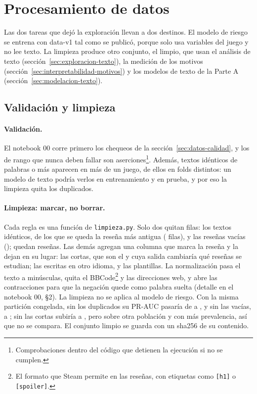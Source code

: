 \section{Procesamiento de datos}\label{sec:procesamiento}

Las dos tareas que dejó la exploración llevan a dos destinos. El modelo de riesgo se entrena con
data-v1 tal como se publicó, porque solo usa variables del juego y no lee texto. La limpieza
produce otro conjunto, el limpio, que usan el análisis de texto (sección~\ref{sec:exploracion-texto}),
la medición de los motivos (sección~\ref{sec:interpretabilidad-motivos}) y los modelos de texto de
la Parte A (sección~\ref{sec:modelacion-texto}).

\subsection{Validación y limpieza}\label{sec:procesamiento-validacion}\label{sec:procesamiento-limpieza}

\paragraph{Validación.} El notebook 00 corre primero los chequeos de la
sección~\ref{sec:datos-calidad}, y los de rango que nunca deben fallar son
aserciones\footnote{Comprobaciones dentro del código que detienen la ejecución si no se cumplen.}.
Además, \cifraTextosEntreJuegos{} textos idénticos de \cifraPalabrasDeUnaCopia{} palabras o más
aparecen en más de un juego, \cifraCopiasEnFoldsDistintos{} de ellos en folds distintos: un modelo
de texto podría verlos en entrenamiento y en prueba, y por eso la limpieza quita los duplicados.

\paragraph{Limpieza: marcar, no borrar.} Cada regla es una función de \texttt{limpieza.py}. Solo
dos quitan filas: los textos idénticos, de los que se
queda la reseña más antigua (\cifraDuplicadosQuitados{} filas), y las reseñas vacías
(\cifraVaciasQuitadas{}); quedan \cifraResenasLimpias{} reseñas. Las demás agregan una columna que
marca la reseña y la dejan en su lugar: las cortas, que son el \cifraCortasPorResena{} y cuya
salida cambiaría qué reseñas se estudian; las escritas en otro idioma, y las plantillas. La
normalización pasa el texto a minúsculas, quita el BBCode\footnote{El formato que Steam permite en
las reseñas, con etiquetas como \texttt{[h1]} o \texttt{[spoiler]}.} y las direcciones web, y abre
las contracciones para que la negación quede como palabra suelta (detalle en el notebook 00,
§2). La limpieza no se aplica al modelo de riesgo. Con la misma partición congelada, sin los
duplicados su PR-AUC pasaría de \cifraPRAUCModelo{} a \cifraPRAUCSinDuplicados{}, y sin las vacías,
a \cifraPRAUCSinVacias{}; sin las cortas subiría a \cifraPRAUCSinCortas{}, pero sobre otra
población y con más prevalencia, así que no se compara. El conjunto limpio se guarda con un sha256
de su contenido.

